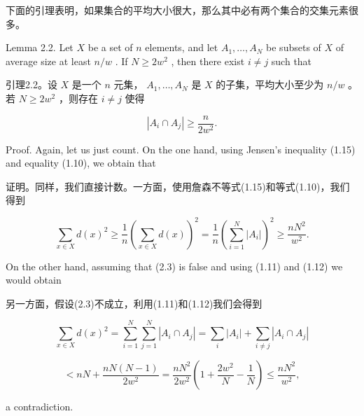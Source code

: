 \documentclass[10pt]{article}
\begin{document}
\begin{tcolorbox}\relax
下面的引理表明，如果集合的平均大小很大，那么其中必有两个集合的交集元素很多。
\end{tcolorbox}

Lemma 2.2. Let \(X\) be a set of \(n\) elements, and let \({A}_{1},\ldots ,{A}_{N}\) be subsets of \(X\) of average size at least \(n/w\) . If \(N \geq  2{w}^{2}\) , then there exist \(i \neq  j\) such that

\begin{tcolorbox}\relax
引理2.2。设 \(X\) 是一个 \(n\) 元集， \({A}_{1},\ldots ,{A}_{N}\) 是 \(X\) 的子集，平均大小至少为 \(n/w\) 。若 \(N \geq  2{w}^{2}\) ，则存在 \(i \neq  j\) 使得
\end{tcolorbox}

\[
\left| {{A}_{i} \cap  {A}_{j}}\right|  \geq  \frac{n}{2{w}^{2}}. \tag{2.3}
\]

Proof. Again, let us just count. On the one hand, using Jensen's inequality (1.15) and equality (1.10), we obtain that

\begin{tcolorbox}\relax
证明。同样，我们直接计数。一方面，使用詹森不等式(1.15)和等式(1.10)，我们得到
\end{tcolorbox}

\[
\mathop{\sum }\limits_{{x \in  X}}d{\left( x\right) }^{2} \geq  \frac{1}{n}{\left( \mathop{\sum }\limits_{{x \in  X}}d\left( x\right) \right) }^{2} = \frac{1}{n}{\left( \mathop{\sum }\limits_{{i = 1}}^{N}\left| {A}_{i}\right| \right) }^{2} \geq  \frac{n{N}^{2}}{{w}^{2}}.
\]

On the other hand, assuming that (2.3) is false and using (1.11) and (1.12) we would obtain

\begin{tcolorbox}\relax
另一方面，假设(2.3)不成立，利用(1.11)和(1.12)我们会得到
\end{tcolorbox}

\[
\mathop{\sum }\limits_{{x \in  X}}d{\left( x\right) }^{2} = \mathop{\sum }\limits_{{i = 1}}^{N}\mathop{\sum }\limits_{{j = 1}}^{N}\left| {{A}_{i} \cap  {A}_{j}}\right|  = \mathop{\sum }\limits_{i}\left| {A}_{i}\right|  + \mathop{\sum }\limits_{{i \neq  j}}\left| {{A}_{i} \cap  {A}_{j}}\right|
\]

\[
< {nN} + \frac{{nN}\left( {N - 1}\right) }{2{w}^{2}} = \frac{n{N}^{2}}{2{w}^{2}}\left( {1 + \frac{2{w}^{2}}{N} - \frac{1}{N}}\right)  \leq  \frac{n{N}^{2}}{{w}^{2}},
\]

a contradiction.
\end{document}
